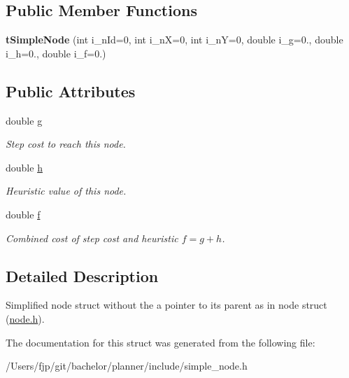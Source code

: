 \subsection*{Public Member Functions}
\begin{DoxyCompactItemize}
\item 
\mbox{\label{structplanner_1_1t_simple_node_a2351b76c262d06c2a2994c2ccdc5b01c}} 
{\bfseries t\+Simple\+Node} (int i\+\_\+n\+Id=0, int i\+\_\+nX=0, int i\+\_\+nY=0, double i\+\_\+g=0., double i\+\_\+h=0., double i\+\_\+f=0.)
\end{DoxyCompactItemize}
\subsection*{Public Attributes}
\begin{DoxyCompactItemize}
\item 
\mbox{\label{structplanner_1_1t_simple_node_aa75a8701dd9f556dee00365465aa21b5}} 
double \mbox{\hyperlink{structplanner_1_1t_simple_node_aa75a8701dd9f556dee00365465aa21b5}{g}}
\begin{DoxyCompactList}\small\item\em Step cost to reach this node. \end{DoxyCompactList}\item 
\mbox{\label{structplanner_1_1t_simple_node_ae094d2027225ecdf4d5adc27177a9daa}} 
double \mbox{\hyperlink{structplanner_1_1t_simple_node_ae094d2027225ecdf4d5adc27177a9daa}{h}}
\begin{DoxyCompactList}\small\item\em Heuristic value of this node. \end{DoxyCompactList}\item 
\mbox{\label{structplanner_1_1t_simple_node_a3411f599ba06ac5373746571ac5223e6}} 
double \mbox{\hyperlink{structplanner_1_1t_simple_node_a3411f599ba06ac5373746571ac5223e6}{f}}
\begin{DoxyCompactList}\small\item\em Combined cost of step cost and heuristic $f = g + h$. \end{DoxyCompactList}\end{DoxyCompactItemize}


\subsection{Detailed Description}
Simplified node struct without the a pointer to its parent as in node struct (\mbox{\hyperlink{node_8h_source}{node.\+h}}). 

The documentation for this struct was generated from the following file\+:\begin{DoxyCompactItemize}
\item 
/\+Users/fjp/git/bachelor/planner/include/simple\+\_\+node.\+h\end{DoxyCompactItemize}
